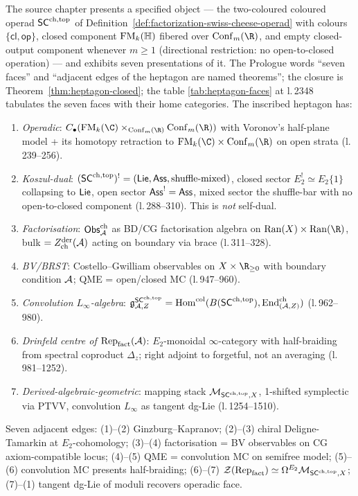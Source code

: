 The source chapter presents a specified object --- the two-coloured coloured operad $\mathsf{SC}^{\mathrm{ch},\mathrm{top}}$ of Definition~\ref*{def:factorization-swiss-cheese-operad} with colours $\{\mathsf{cl}, \mathsf{op}\}$, closed component $\mathrm{FM}_k(\mathbb H)$ fibered over $\Conf_m(\R)$, and empty closed-output component whenever $m \ge 1$ (directional restriction: no open-to-closed operation) --- and exhibits seven presentations of it. The Prologue words ``seven faces'' and ``adjacent edges of the heptagon are named theorems''; the closure is Theorem~\ref*{thm:heptagon-closed}; the table \ref*{tab:heptagon-faces} at l.\,2348 tabulates the seven faces with their home categories. The inscribed heptagon has:

\begin{enumerate}[label=\textbf{Face~\arabic*.}, leftmargin=*]
\item \emph{Operadic}: $C_\bullet(\FM_k(\C) \times_{\Conf_m(\R)} \Conf_m(\R))$ with Voronov's half-plane model + its homotopy retraction to $\FM_k(\C) \times \Conf_m(\R)$ on open strata (l.\,239--256).
\item \emph{Koszul-dual}: $(\mathsf{SC}^{\mathrm{ch},\mathrm{top}})^! = (\mathsf{Lie}, \mathsf{Ass}, \text{shuffle-mixed})$, closed sector $E_2^! \simeq E_2\{1\}$ collapsing to $\mathsf{Lie}$, open sector $\mathsf{Ass}^! = \mathsf{Ass}$, mixed sector the shuffle-bar with no open-to-closed component (l.\,288--310). This is \emph{not} self-dual.
\item \emph{Factorisation}: $\mathsf{Obs}^{\mathrm{ch}}_{\mathcal{A}}$ as BD/CG factorisation algebra on $\Ran(X) \times \Ran(\R)$, bulk $= Z^{\mathrm{der}}_{\mathrm{ch}}(\mathcal{A})$ acting on boundary via brace (l.\,311--328).
\item \emph{BV/BRST}: Costello--Gwilliam observables on $X \times \R_{\ge 0}$ with boundary condition $\mathcal{A}$; QME = open/closed MC (l.\,947--960).
\item \emph{Convolution $L_\infty$-algebra}: $\mathfrak{g}^{\mathsf{SC}^{\mathrm{ch},\mathrm{top}}}_{\mathcal{A}, Z} = \mathrm{Hom}^{\mathrm{col}}(B(\mathsf{SC}^{\mathrm{ch},\mathrm{top}}), \mathrm{End}^{\mathrm{ch}}_{(\mathcal{A}, Z)})$ (l.\,962--980).
\item \emph{Drinfeld centre of $\mathrm{Rep}_{\mathrm{fact}}(\mathcal{A})$}: $E_2$-monoidal $\infty$-category with half-braiding from spectral coproduct $\Delta_z$; right adjoint to forgetful, not an averaging (l.\,981--1252).
\item \emph{Derived-algebraic-geometric}: mapping stack $\mathcal{M}_{\mathsf{SC}^{\mathrm{ch},\mathrm{top}}, X}$, 1-shifted symplectic via PTVV, convolution $L_\infty$ as tangent dg-Lie (l.\,1254--1510).
\end{enumerate}

Seven adjacent edges: (1)--(2) Ginzburg--Kapranov; (2)--(3) chiral Deligne-Tamarkin at $E_2$-cohomology; (3)--(4) factorisation = BV observables on CG axiom-compatible locus; (4)--(5) QME = convolution MC on semifree model; (5)--(6) convolution MC presents half-braiding; (6)--(7) $\mathcal{Z}(\mathrm{Rep}_{\mathrm{fact}}) \simeq \Omega^{E_2} \mathcal{M}_{\mathsf{SC}^{\mathrm{ch},\mathrm{top}}, X}$; (7)--(1) tangent dg-Lie of moduli recovers operadic face.

